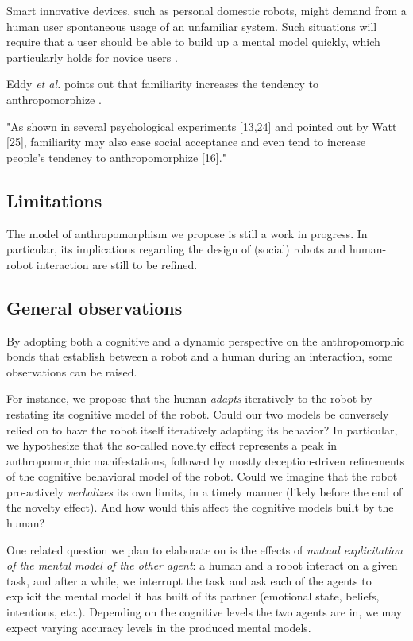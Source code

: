 \documentclass{frontiersSCNS} %
\begin{document}
Smart innovative devices, such as personal domestic robots, might demand from a
human user spontaneous usage of an unfamiliar system. Such situations will
require that a user should be able to build up a mental model quickly, which
particularly holds for novice users \cite{schmitz_concepts_2011}.

Eddy \textit{et al.} points out that familiarity increases the tendency to
anthropomorphize \cite{eddy_attribution_1993}.

"As shown in several psychological experiments [13,24] and pointed out by Watt
[25], familiarity may also ease social acceptance and even tend to increase
people's tendency to anthropomorphize [16]." \cite{duffy_anthropomorphism_2003}


\subsection{Limitations}

The model of anthropomorphism we propose is still a work in progress. In
particular, its implications regarding the design of (social) robots and
human-robot interaction are still to be refined.

\subsection{General observations}

By adopting both a cognitive and a dynamic perspective on the anthropomorphic
bonds that establish between a robot and a human during an interaction, some
observations can be raised.

For instance, we propose that the human \emph{adapts} iteratively to the robot
by restating its cognitive model of the robot. Could our two models be
conversely relied on to have the robot itself iteratively adapting its
behavior? In particular, we hypothesize that the so-called novelty effect
represents a peak in anthropomorphic manifestations, followed by mostly
deception-driven refinements of the cognitive behavioral model of the robot.
Could we imagine that the robot pro-actively \emph{verbalizes} its own limits,
in a timely manner (likely before the end of the novelty effect). And how would
this affect the cognitive models built by the human?

One related question we plan to elaborate on is the effects of \emph{mutual
explicitation of the mental model of the other agent}: a human and a robot
interact on a given task, and after a while, we interrupt the task and ask each
of the agents to explicit the mental model it has built of its partner
(emotional state, beliefs, intentions, etc.). Depending on the cognitive levels
the two agents are in, we may expect varying accuracy levels in the produced
mental models.
\end{document}
